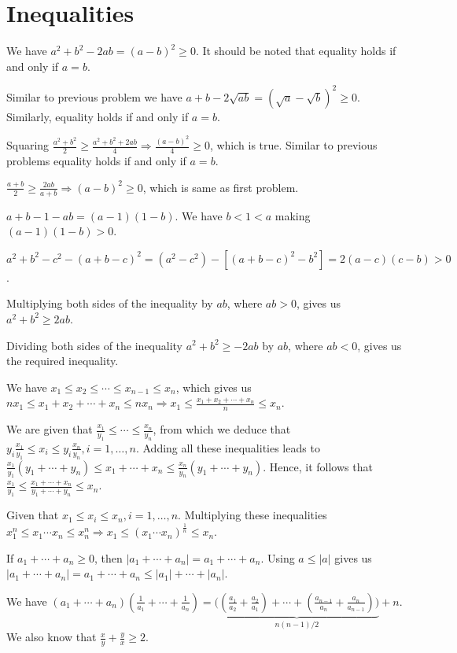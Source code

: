\chapter{Inequalities}
\startitemize[n]
\item We have $a^2 + b^2 - 2ab = (a - b)^2\geq 0$. It should be noted that equality holds if and only if $a
  = b$.
\item Similar to previous problem we have $a + b - 2\sqrt{ab} = (\sqrt{a} - \sqrt{b})^2\geq 0$. Similarly,
  equality holds if and only if $a = b$.
\item Squaring $\frac{a^2 + b^2}{2}\geq \frac{a^2 + b^2 + 2ab}{4}\Rightarrow \frac{(a - b)^2}{4}\geq 0$,
  which is true. Similar to previous problems equality holds if and only if $a = b$.
\item $\frac{a + b}{2}\geq \frac{2ab}{a + b}\Rightarrow (a - b)^2\geq 0$, which is same as first problem.
\item $a + b - 1 - ab = (a - 1)(1 - b)$. We have $b < 1 < a$ making $(a - 1)(1 - b) > 0$.
\item $a^2 + b^2 - c^2 - (a + b - c)^2 = (a^2 - c^2) - [(a + b - c)^2 - b^2] = 2(a - c)(c - b) > 0$.
\item Multiplying both sides of the inequality by $ab$, where $ab > 0$, gives us $a^2 + b^2\geq 2ab$.
\item Dividing both sides of the inequality $a^2 +b^2 \geq -2ab$ by $ab$, where $ab < 0$, gives us
  the required inequality.
\item We have $x_1\leq x_2\leq \cdots\leq x_{n - 1}\leq x_n$, which gives us $nx_1\leq x_1 + x_2 + \cdots +
  x_n\leq nx_n \Rightarrow x_1\leq \frac{x_1 + x_2 + \cdots + x_n}{n}\leq x_n$.
\item We are given that $\frac{x_1}{y_1}\leq\cdots\leq \frac{x_n}{y_n}$, from which we deduce that
  $y_i\frac{x_1}{y_1}\leq x_i\leq y_i\frac{x_n}{y_n}, i = 1, \ldots, n$. Adding all these inequalities leads
  to $\frac{x_1}{y_1}(y_1 + \cdots + y_n)\leq x_1 + \cdots + x_n\leq \frac{x_n}{y_n}(y_1 +
  \cdots + y_n)$. Hence, it follows that $\frac{x_1}{y_1}\leq \frac{x_1 + \cdots + x_n}{y_1 + \cdots +
    y_n}\leq x_n$.
\item Given that $x_1\leq x_i\leq x_n, i = 1, \ldots, n$. Multiplying these inequalities $x_1^n\leq
  x_1\cdots x_n\leq x_n^n \Rightarrow x_1\leq (x_1\cdots x_n)^{\frac{1}{n}}\leq x_n$.
\item If $a_1 + \cdots + a_n \geq 0$, then $|a_1 + \cdots + a_n| = a_1 + \cdots + a_n$. Using $a\leq |a|$
  gives us $|a_1 + \cdots + a_n| = a_1 + \cdots + a_n\leq |a_1| + \cdots + |a_n|$.
\item We have $(a_1 + \cdots + a_n)\left(\frac{1}{a_1} + \cdots + \frac{1}{a_n}\right) =
  \underbrace{\Big(\left(\frac{a_1}{a_2} + \frac{a_2}{a_1}\right) + \cdots + \left(\frac{a_{n - 1}}{a_n} +
    \frac{a_n}{a_{n - 1}}\right)\Big)}_{n(n - 1)/2} + n$. We also know that $\frac{x}{y} + \frac{y}{x}\geq 2$.

